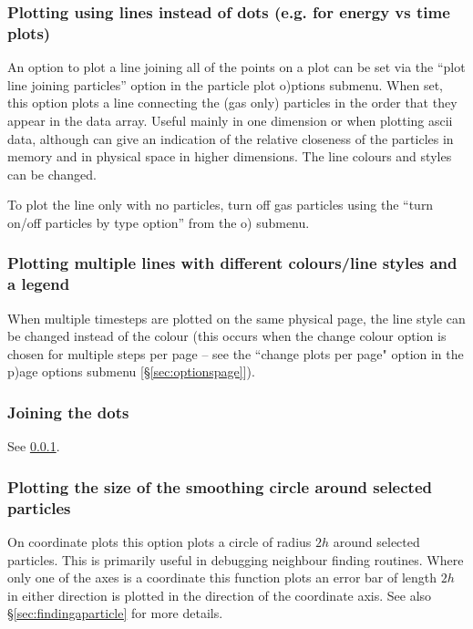 \documentclass[a4paper,10pt]{article}
\begin{document}
\subsubsection{ Plotting using lines instead of dots (e.g. for energy vs time plots)}
\label{sec:lines}
 An option to plot a line joining all of the points on a plot can be set via the ``plot line joining particles'' option in the particle plot o)ptions submenu. When set, this option plots a line connecting the (gas only) particles
in the order that they appear in the data array. Useful mainly in one dimension or when plotting ascii data, although can give an indication of the relative closeness of the particles in memory and in physical space in higher dimensions. The line colours and styles can be changed.

 To plot the line only with no particles, turn off gas particles using the ``turn on/off particles by type option'' from the o) submenu.
 
\subsubsection{ Plotting multiple lines with different colours/line styles and a legend}

 When multiple timesteps are plotted on the same physical page, the line style can be
changed instead of the colour (this occurs when the change colour option is chosen for multiple steps per page
-- see the ``change plots per page" option in the p)age options submenu [\S\ref{sec:optionspage}]).

\subsubsection{ Joining the dots}
See \ref{sec:lines}.

\subsubsection{ Plotting the size of the smoothing circle around selected particles}
\label{sec:smoothingcircle}
On coordinate plots this option plots a circle of
radius $2h$ around selected particles. 
This is primarily useful in debugging neighbour finding routines. Where only one of the axes is a 
coordinate this function plots an error bar of length $2h$ in either direction is plotted
in the direction of the coordinate axis. See also \S\ref{sec:findingaparticle} for more details.
\end{document}

